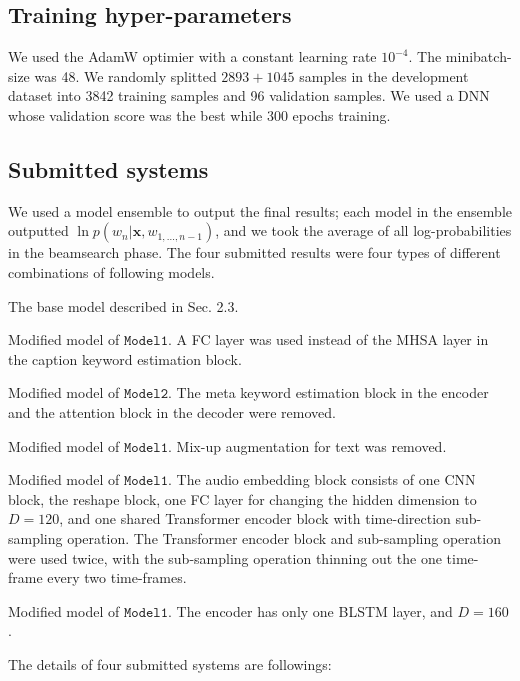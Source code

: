 \documentclass{article}
\begin{document}
\begin{sloppy}
\subsection{Training hyper-parameters}
We used the AdamW \cite{adamw} optimier with a constant learning rate $10^{-4}$. The minibatch-size was 48.
We randomly splitted $2893 + 1045$ samples in the development dataset into 3842 training samples and 96 validation samples.
We used a DNN whose validation score was the best while 300 epochs training.




\subsection{Submitted systems}

We used a model ensemble to output the final results; each model in the ensemble outputted $\ln p( w_n | \bm{x}, w_{1,..., n-1} )$, and we took the average of all log-probabilities in the beamsearch phase.
The four submitted results were four types of different combinations of following models.
\begin{description}
 \setlength{\parskip}{0cm} 
 \setlength{\itemsep}{0.1cm} 
\item[$\mathtt{Model1}$] The base model described in Sec. 2.3.
\item[$\mathtt{Model2}$] Modified model of $\mathtt{Model1}$. A FC layer was used instead of the MHSA layer in the caption keyword estimation block.
\item[$\mathtt{Model3}$] Modified model of $\mathtt{Model2}$. The meta keyword estimation block in the encoder and the attention block in the decoder were removed.
\item[$\mathtt{Model4}$] Modified model of $\mathtt{Model1}$. Mix-up augmentation for text was removed.
\item[$\mathtt{Model5}$] Modified model of $\mathtt{Model1}$. The audio embedding block consists of 
one CNN block, the reshape block, one FC layer for changing the hidden dimension to $D=120$, and one shared Transformer encoder block \cite{transformer} with time-direction sub-sampling operation. The Transformer encoder block and sub-sampling operation were used twice, with the sub-sampling operation thinning out the one time-frame every two time-frames. 
\item[$\mathtt{Model6}$] Modified model of $\mathtt{Model1}$. The encoder has only one BLSTM layer, and $D=160$.
\end{description}
The details of four submitted systems are followings:

\end{sloppy}
\end{document}
